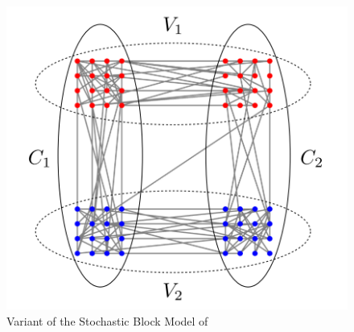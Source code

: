 \begin{figure}
    \centering
    \includegraphics[width=0.9\linewidth]{images/kleindessner_variant_sbm.png}
    \caption{Variant of the Stochastic Block Model of \textcite[4]{Kleindessner2019}}
    \label{fig:kleindessner_variant_sbm}
\end{figure}